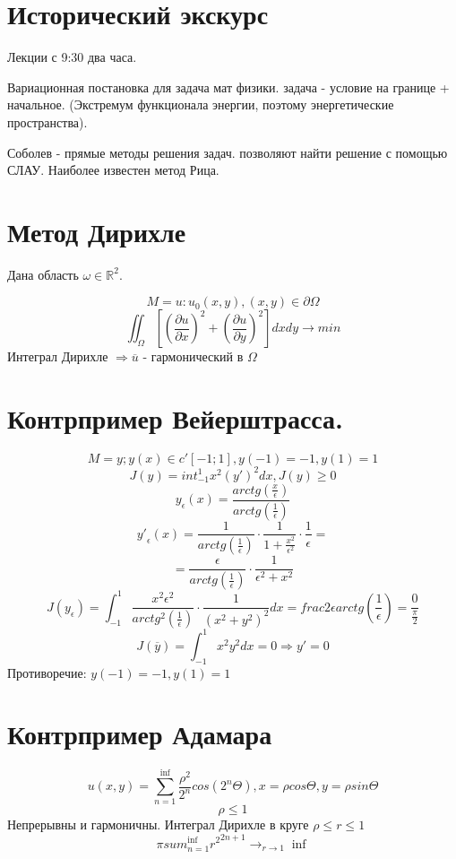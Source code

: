 \documentclass{article}
\begin{document}
\section{Исторический экскурс}

Лекции с 9:30 два часа.

Вариационная постановка для задача мат физики.
задача - условие на границе + начальное. (Экстремум функционала энергии, поэтому энергетические пространства).

Соболев - прямые методы решения задач. позволяют найти решение с помощью СЛАУ. Наиболее известен метод Рица.

\section{Метод Дирихле}

Дана область $ \omega \in \mathbb{R}^2$.

\[ M = {u:u_{0}(x,y), (x,y) \in \partial \Omega} \]
\[ \iint_{\Omega}[{(\frac{\partial u}{\partial x})}^2+{(\frac{\partial u}{\partial y})}^2] dx dy \rightarrow min \]
Интеграл Дирихле $ \Rightarrow \overline{u} $ - гармонический в $ \Omega $

\section{Контрпример Вейерштрасса. }

\[ M={y;y(x) \in c'[-1;1]}, y(-1)=-1, y(1)=1 \]
\[ J(y) = int^1_{-1} x^2{(y')}^2 dx, J(y) \geq 0 \]
\[ y_\epsilon(x) = \frac{arctg(\frac{x}{\epsilon})}{arctg(\frac{1}{\epsilon})} \]
\[ {y'}_{\epsilon}(x) = \frac{1}{arctg(\frac{1}{\epsilon})} \cdot \frac{1}{1+ \frac{x^2}{\epsilon^2}} \cdot \frac{1}{\epsilon} = \]
\[ = \frac{\epsilon} {arctg (\frac{1}{\epsilon})} \cdot \frac{1}{\epsilon^2+x^2} \]
\[ J(y_{\epsilon}) = \int_{-1}^1 \frac{x^2 \epsilon^2}{arctg^2(\frac{1}{\epsilon})} \cdot \frac{1}{{(x^2+y^2)}^2} dx = frac{2 \epsilon}{arctg(\frac{1}{\epsilon})} = \frac{0}{\frac{\pi}{2}}\]
\[ J(\overline{y}) = \int_{-1}^{1} x^2 y^2 dx = 0 \Rightarrow y'=0 \]
Противоречие: $ y(-1)=-1, y(1)=1 $

\section{Контрпример Адамара}

\[ u(x,y) = \sum_{n=1}^{\inf}\frac{\rho^2}{2^n} cos(2^n \Theta), x=\rho cos \Theta, y=\rho sin \Theta \]
\[ \rho \leq 1 \]
Непрерывны и гармоничны.
Интеграл Дирихле в круге $ \rho \leq r \leq 1 $
\[ \pi sum_{n=1}^{\inf} {r^2}^{2n+1} {\rightarrow}_{r \rightarrow 1} \inf \]
\end{document}
